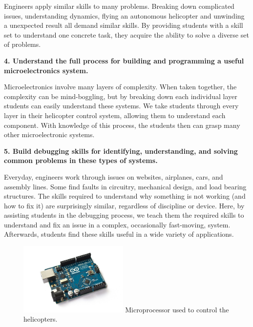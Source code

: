 \documentclass[11pt]{article}
\begin{document}
Engineers apply similar skills to many problems.  Breaking down complicated issues, understanding dynamics, flying an autonomous helicopter and unwinding a unexpected result all demand similar skills.  By providing students with a skill set to understand one concrete task, they acquire the ability to solve a diverse set of problems.

\textbf{4. Understand the full process for building and programming a useful microelectronics system.}

Microelectronics involve many layers of complexity.  When taken together, the complexity can be mind-boggling, but by breaking down each individual layer students can easily understand these systems.  We take students through every layer in their helicopter control system, allowing them to understand each component.  With knowledge of this process, the students then can grasp many other microelectronic systems.

\textbf{5. Build debugging skills for identifying, understanding, and solving common problems in these types of systems.}

Everyday, engineers work through issues on websites, airplanes, cars, and assembly lines.  Some find faults in circuitry, mechanical design, and load bearing structures.  The skills required to understand why something is not working (and how to fix it) are surprisingly similar, regardless of discipline or device.  Here, by assisting students in the debugging process, we teach them the required skills to understand and fix an issue in a complex, occasionally fast-moving, system.  Afterwards, students find these skills useful in a wide variety of applications.

\vspace{20pt}
\begin{figure}
    \begin{center}
    \includegraphics[width=0.48\textwidth]{figures/arduino_uno.jpg}
    {\small Microprocessor used to control the helicopters.\footnotemark}
    \end{center}
    \vspace{-30pt}
\end{figure}
\end{document}
